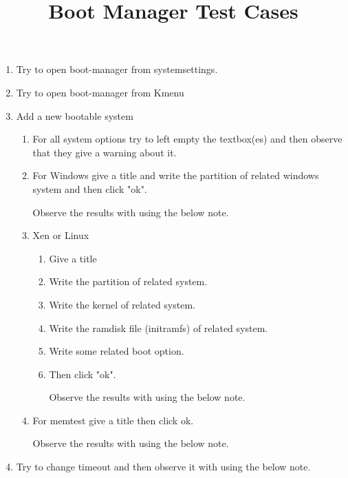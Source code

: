 \documentclass[a4paper,10pt]{article}
\title{Boot Manager Test Cases}
\begin{document}
\maketitle

\begin{enumerate}
    \item Try to open boot-manager from systemsettings.
    \item Try to open boot-manager from Kmenu
    \item Add a new bootable system
    \begin{enumerate}
        \item For all system options try to left empty the textbox(es) and then observe that they give a warning about it.

        \item For Windows give a title and write the partition of related windows system and then click "ok".

            Observe the results with using the below note.


\item Xen or Linux 
\begin{enumerate}
    \item Give a title
    \item Write the partition of related system.
    \item Write the kernel of related system.
    \item Write the ramdisk file (initramfs) of related system.
    \item Write some related boot option.
    \item Then click "ok".

          Observe the results with using the below note.

\end{enumerate}

\item For memtest give a title then click ok.

    Observe the results with using the below note.

    \end{enumerate}
\item Try to change timeout and then observe it with using the below note.
\end{enumerate}
\end{document}
